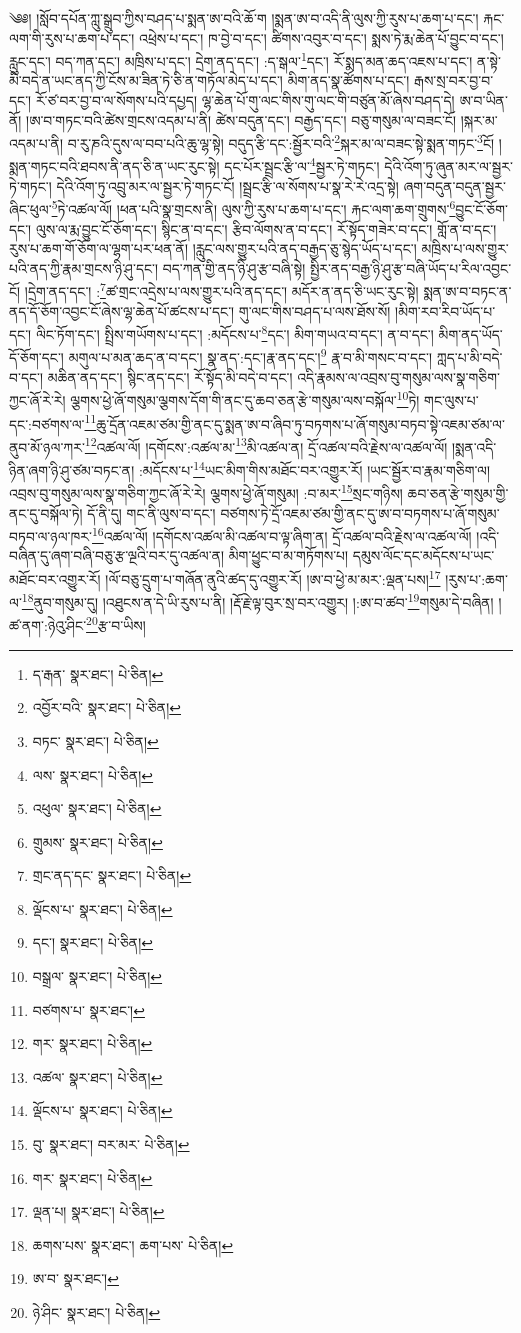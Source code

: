 \setcounter{footnote}{0} 
༄༅། །སློབ་དཔོན་ཀླུ་སྒྲུབ་ཀྱིས་བཤད་པ་སྨན་ཨ་བའི་ཆོ་ག །སྨན་ཨ་བ་འདི་ནི་ལུས་ཀྱི་རུས་པ་ཆག་པ་དང་། རྐང་ལག་གི་རུས་པ་ཆག་པ་དང་། འཕྲེས་པ་དང་། ཁ་བྱེ་བ་དང་། ཚིགས་འབུར་བ་དང་། སྨས་ཏེ་རྨ་ཆེན་པོ་བྱུང་བ་དང་། རླུང་དང་། བད་ཀན་དང་། མཁྲིས་པ་དང་། དྲེག་ནད་དང་། :ད་སྒལ་\footnote{ད་རྒན་  སྣར་ཐང་།  པེ་ཅིན། }དང་། རོ་སྨད་མན་ཆད་འཇས་པ་དང་། ན་སྟེ་མི་བདེ་ན་ཡང་ནད་ཀྱི་ངོས་མ་ཟིན་ཏེ་ཅི་ན་གཏོལ་མེད་པ་དང་། མིག་ནད་སྣ་ཚོགས་པ་དང་། རྒས་སྲ་བར་བྱ་བ་དང་། རོ་ཙ་བར་བྱ་བ་ལ་སོགས་པའི་དཔྱད། ལྷ་ཆེན་པོ་གུ་ལང་གིས་གུ་ལང་གི་བཙུན་མོ་ཞེས་བཤད་དེ། ཨ་བ་ཡིན་ནོ། །ཨ་བ་གཏང་བའི་ཚེས་གྲངས་འདམ་པ་ནི། ཚེས་བདུན་དང་། བརྒྱད་དང་། བཅུ་གསུམ་ལ་བཟང་ངོ། །སྐར་མ་འདམ་པ་ནི། བ་རུ་ཎའི་དུས་ལ་བབ་པའི་ཆུ་ལྷ་སྟེ། བདུད་རྩི་དང་:སྦྱོར་བའི་\footnote{འབྱོར་བའི་  སྣར་ཐང་།  པེ་ཅིན། }སྐར་མ་ལ་བཟང་སྟེ་སྨན་གཏང་\footnote{བཏང་  སྣར་ཐང་།  པེ་ཅིན། }ངོ། །སྨན་གཏང་བའི་ཐབས་ནི་ནད་ཅི་ན་ཡང་རུང་སྟེ། དང་པོར་སྦྲང་རྩི་ལ་\footnote{ལས་  སྣར་ཐང་།  པེ་ཅིན། }སྦྱར་ཏེ་གཏང་། དེའི་འོག་ཏུ་ཞུན་མར་ལ་སྦྱར་ཏེ་གཏང་། དེའི་འོག་ཏུ་འབྲུ་མར་ལ་སྦྱར་ཏེ་གཏང་ངོ། །སྦྲང་རྩི་ལ་སོགས་པ་སྣ་རེ་རེ་འདྲ་སྟེ། ཞག་བདུན་བདུན་སྦྱར་ཞིང་ཕུལ་\footnote{འཕུལ་  སྣར་ཐང་།  པེ་ཅིན། }ཏེ་འཚལ་ལོ། །ཕན་པའི་སྣ་གྲངས་ནི། ལུས་ཀྱི་རུས་པ་ཆག་པ་དང་། རྐང་ལག་ཆག་གྲུགས་\footnote{གྲུམས་  སྣར་ཐང་།  པེ་ཅིན། }བྱུང་ངོ་ཅོག་དང་། ལུས་ལ་རྨ་བྱུང་ངོ་ཅོག་དང་། སྙིང་ན་བ་དང་། རྩིབ་ལོགས་ན་བ་དང་། རོ་སྟོད་གཟེར་བ་དང་། གློ་ན་བ་དང་། རུས་པ་ཆག་གོ་ཅོག་ལ་ལྷག་པར་ཕན་ནོ། །རླུང་ལས་གྱུར་པའི་ནད་བརྒྱད་ཅུ་སྙེད་ཡོད་པ་དང་། མཁྲིས་པ་ལས་གྱུར་པའི་ནད་ཀྱི་རྣམ་གྲངས་ཉི་ཤུ་དང་། བད་ཀན་གྱི་ནད་ཉི་ཤུ་རྩ་བཞི་སྟེ། སྤྱིར་ནད་བརྒྱ་ཉི་ཤུ་རྩ་བཞི་ཡོད་པ་རིལ་འབྱང་ངོ། །དྲེག་ནད་དང་། :\footnote{གྲང་ནད་དང་  སྣར་ཐང་།  པེ་ཅིན། }ཚ་གྲང་འདྲེས་པ་ལས་གྱུར་པའི་ནད་དང་། མདོར་ན་ནད་ཅི་ཡང་རུང་སྟེ། སྨན་ཨ་བ་བཏང་ན་ནད་དོ་ཅོག་འབྱང་ངོ་ཞེས་ལྷ་ཆེན་པོ་ཚངས་པ་དང་། གུ་ལང་གིས་བཤད་པ་ལས་ཐོས་སོ། །མིག་རབ་རིབ་ཡོད་པ་དང་། ལིང་ཏོག་དང་། སྤྲིས་གཡོགས་པ་དང་། :མདོངས་པ་\footnote{ལྡོངས་པ་  སྣར་ཐང་།  པེ་ཅིན། }དང་། མིག་གཡའ་བ་དང་། ན་བ་དང་། མིག་ནད་ཡོད་དོ་ཅོག་དང་། མགུལ་པ་མན་ཆད་ན་བ་དང་། སྣ་ནད་:དང་།རྣ་ནད་དང་།\footnote{དང་།  སྣར་ཐང་།  པེ་ཅིན། } རྣ་བ་མི་གསང་བ་དང་། ཀླད་པ་མི་བདེ་བ་དང་། མཆིན་ནད་དང་། སྙིང་ནད་དང་། རོ་སྟོད་མི་བདེ་བ་དང་། འདི་རྣམས་ལ་འབྲས་བུ་གསུམ་ལས་སྣ་གཅིག་ཀྱང་ཞོ་རེ་རེ། ལྕགས་ཕྱེ་ཞོ་གསུམ་ལྕགས་དོག་གི་ནང་དུ་ཆབ་ཅན་རྩེ་གསུམ་ལས་བསྐོལ་\footnote{བསྒྲལ་  སྣར་ཐང་།  པེ་ཅིན། }ཏེ། གང་ལུས་པ་དང་:བཙགས་ལ་\footnote{བཙགས་པ་  སྣར་ཐང་། }ཆུ་དྲོན་འཇམ་ཙམ་གྱི་ནང་དུ་སྨན་ཨ་བ་ཞིབ་ཏུ་བཏགས་པ་ཞོ་གསུམ་བཏབ་སྟེ་འཇམ་ཙམ་ལ་ནུབ་མོ་ཉལ་ཀར་\footnote{གར་  སྣར་ཐང་།  པེ་ཅིན། }འཚལ་ལོ། །དགོངས་:འཚལ་མ་\footnote{འཚལ་  སྣར་ཐང་།  པེ་ཅིན། }མི་འཚལ་ན། དྲོ་འཚལ་བའི་རྗེས་ལ་འཚལ་ལོ། །སྨན་འདི་ཉིན་ཞག་ཉི་ཤུ་ཙམ་བཏང་ན། :མདོངས་པ་\footnote{ལྡོངས་པ་  སྣར་ཐང་།  པེ་ཅིན། }ཡང་མིག་གིས་མཐོང་བར་འགྱུར་རོ། །ཡང་སྦྱོར་བ་རྣམ་གཅིག་ལ། འབྲས་བུ་གསུམ་ལས་སྣ་གཅིག་ཀྱང་ཞོ་རེ་རེ། ལྕགས་ཕྱེ་ཞོ་གསུམ། :བ་མར་\footnote{བུ་  སྣར་ཐང་། བར་མར་  པེ་ཅིན། }སྲང་གཉིས། ཆབ་ཅན་རྩེ་གསུམ་གྱི་ནང་དུ་བསྐོལ་ཏེ། དོ་ནི་དུ། གང་ནི་ལུས་བ་དང་། བཙགས་ཏེ་དྲོ་འཇམ་ཙམ་གྱི་ནང་དུ་ཨ་བ་བཏགས་པ་ཞོ་གསུམ་བཏབ་ལ་ཉལ་ཁར་\footnote{གར་  སྣར་ཐང་།  པེ་ཅིན། }འཚལ་ལོ། །དགོངས་འཚལ་མི་འཚལ་བ་ལྟ་ཞིག་ན། དྲོ་འཚལ་བའི་རྗེས་ལ་འཚལ་ལོ། །འདི་བཞིན་དུ་ཞག་བཞི་བཅུ་རྩ་ལྔའི་བར་དུ་འཚལ་ན། མིག་ཕྱུང་བ་མ་གཏོགས་པ། དམུས་ལོང་དང་མདོངས་པ་ཡང་མཐོང་བར་འགྱུར་རོ། །ལོ་བཅུ་དྲུག་པ་གཞོན་ནུའི་ཚད་དུ་འགྱུར་རོ། །ཨ་བ་ཕྱེ་མ་མར་:ལྡན་པས།\footnote{ལྡན་པ།  སྣར་ཐང་།  པེ་ཅིན། } །རུས་པ་:ཆག་ལ་\footnote{ཆགས་པས་  སྣར་ཐང་། ཆག་པས་  པེ་ཅིན། }ནུབ་གསུམ་དུ། །འཐུངས་ན་དེ་ཡི་རུས་པ་ནི། །རྡོ་རྗེ་ལྟ་བུར་སྲ་བར་འགྱུར། །:ཨ་བ་ཚབ་\footnote{ཨ་བ་  སྣར་ཐང་། }གསུམ་དེ་བཞིན། །ཚ་ནག་:ཉེའུ་ཤིང་\footnote{ཉེ་ཤིང་  སྣར་ཐང་།  པེ་ཅིན། }རྩ་བ་ཡིས། 